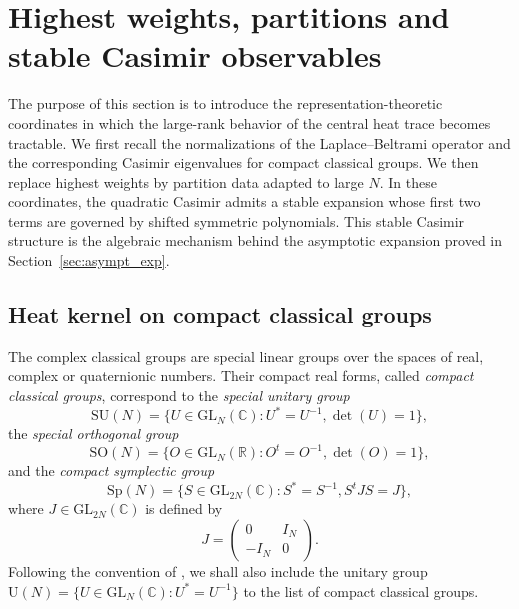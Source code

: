 \documentclass[11pt,a4paper,reqno]{article}
\theoremstyle{definition}
\theoremstyle{remark}
\newcommand\SU{{\mathrm{SU}}}
\newcommand\SO{{\mathrm{SO}}}
\newcommand\Sp{{\mathrm{Sp}}}
\newcommand\GL{{\mathrm{GL}}}
\newcommand\U{{\mathrm U}}
\newcommand\R{\mathbb{R}}
\newcommand\C{\mathbb{C}}
\begin{document}
\section{Highest weights, partitions and stable Casimir observables}\label{sec:prelim}

The purpose of this section is to introduce the representation-theoretic coordinates in which the large-rank behavior of the central heat trace becomes tractable. We first recall the normalizations of the Laplace--Beltrami operator and the corresponding Casimir eigenvalues for compact classical groups. We then replace highest weights by partition data adapted to large $N$. In these coordinates, the quadratic Casimir admits a stable expansion whose first two terms are governed by shifted symmetric polynomials. This stable Casimir structure is the algebraic mechanism behind the asymptotic expansion proved in Section~\ref{sec:asympt_exp}.

\subsection{Heat kernel on compact classical groups}

The complex classical groups are special linear groups over the spaces of real, complex or quaternionic numbers. Their compact real forms, called \emph{compact classical groups}, correspond to the \emph{special unitary group}
\[
\SU(N)=\{U\in\GL_N(\C): U^*=U^{-1},\det(U)=1\},
\]
the \emph{special orthogonal group}
\[
\SO(N)=\{O\in\GL_N(\R):O^t=O^{-1},\det(O)=1\},
\]
and the \emph{compact symplectic group}
\[
\Sp(N)=\{S\in\GL_{2N}(\C):S^*=S^{-1},S^tJS=J\},
\]
where $J\in\GL_{2N}(\C)$ is defined by
\[
J=\begin{pmatrix}
0 & I_{N}\\
-I_{N} & 0
\end{pmatrix}.
\]
Following the convention of \cite{DL}, we shall also include the unitary group $\U(N)=\{U\in\GL_N(\C):U^*=U^{-1}\}$ to the list of compact classical groups. 
\end{document}
